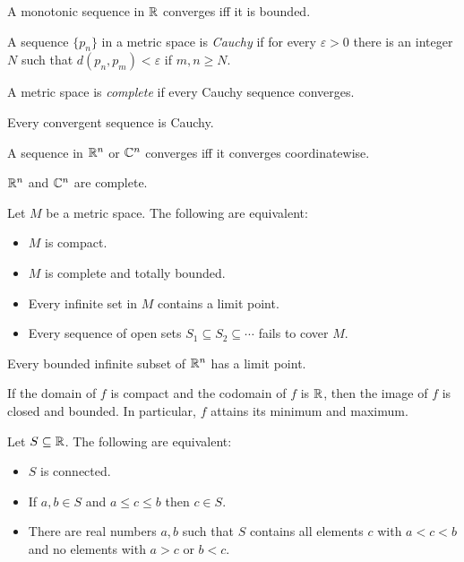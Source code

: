 \begin{thm}
    A monotonic sequence in $\mathbb{R}$ converges iff it is bounded.
\end{thm}
\begin{defn}
  A sequence $\{p_n\}$ in a metric space is \emph{Cauchy} if for every
  $\varepsilon>0$ there is an integer $N$ such that $d(p_n,p_m)<\varepsilon$ if
  $m,n\ge N$.

  A metric space is \emph{complete} if every Cauchy sequence converges.
\end{defn}
\begin{prop}
  Every convergent sequence is Cauchy.
\end{prop}
\begin{prop}
  A sequence in $\mathbb{R}^n$ or $\mathbb{C}^n$ converges iff it converges coordinatewise.
\end{prop}
\begin{cor}
  $\mathbb{R}^n$ and $\mathbb{C}^n$ are complete.
\end{cor}
\begin{prop}
    Let $M$ be a metric space. The following are equivalent:
    \begin{itemize}
        \item $M$ is compact.
        \item $M$ is complete and totally bounded.
        \item Every infinite set in $M$ contains a limit point.
        \item Every sequence of open sets $S_1\subseteq S_2\subseteq\cdots$
            fails to cover $M$.
    \end{itemize}
\end{prop}
\begin{cor}[Weierstrass]
  Every bounded infinite subset of $\mathbb{R}^n$ has a limit point.
\end{cor}
\begin{cor}
    If the domain of $f$ is compact and the codomain of $f$ is $\mathbb{R}$, then the
    image of $f$ is closed and bounded. In particular, $f$ attains its minimum
    and maximum.
\end{cor}
\begin{prop}
    Let $S\subseteq\mathbb{R}$. The following are equivalent:
    \begin{itemize}
        \item $S$ is connected.
        \item If $a,b\in S$ and $a\le c\le b$ then $c\in S$.
        \item There are real numbers $a,b$ such that $S$ contains all elements
            $c$ with $a<c<b$ and no elements with $a>c$ or $b<c$.
    \end{itemize}
\end{prop}
